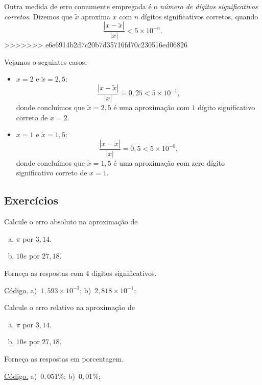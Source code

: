Outra medida de erro comumente empregada é o \emph{número de dígitos significativos corretos}. Dizemos que $\tilde{x}$ aproxima $x$ com $n$ dígitos significativos corretos, quando
\begin{equation}
  \frac{|x - \tilde{x}|}{|x|} < 5\times 10^{-n}.
\end{equation}
>>>>>>> e6e6914b2d7c20b7d35716fd70c230516ed06826

\begin{ex}\label{ex:numdigsigcorr}
  Vejamos o seguintes casos:
  \begin{itemize}
  \item $x=2$ e $\tilde{x} = 2,5$:
    \begin{equation}
      \frac{|x - \tilde{x}|}{|x|} = 0,25 < 5\times 10^{-1},
    \end{equation}
donde concluímos que $\tilde{x}=2,5$ é uma aproximação com $1$ dígito significativo correto de $x=2$.
  \item $x=1$ e $\tilde{x} = 1,5$:
    \begin{equation}
      \frac{|x - \tilde{x}|}{|x|} = 0,5 < 5\times 10^{-0},
    \end{equation}
donde concluímos que $\tilde{x}=1,5$ é uma aproximação com zero dígito significativo correto de $x=1$.
  \end{itemize}
\end{ex}

\subsection*{Exercícios}

\begin{exer}\label{exer:erro_abs}
  Calcule o erro absoluto na aproximação de
  \begin{enumerate}[a)]
  \item $\pi$ por $3,14$.
  \item $10e$ por $27,18$.
  \end{enumerate}
  Forneça as respostas com $4$ dígitos significativos.
\end{exer}
\begin{resp}
  \ifisoctave 
  \href{https://github.com/phkonzen/notas/blob/master/src/MatematicaNumerica/cap_aritm/dados/exer_erro_abs/exer_erro_abs.m}{Código.} 
  \fi
  a)~$1,593\times 10^{-3}$; b)~$2,818\times 10^{-1}$;
\end{resp}

\begin{exer}\label{exer:erro_rel}
  Calcule o erro relativo na aproximação de
  \begin{enumerate}[a)]
  \item $\pi$ por $3,14$.
  \item $10e$ por $27,18$.
  \end{enumerate}
  Forneça as respostas em porcentagem.
\end{exer}
\begin{resp}
  \ifisoctave 
  \href{https://github.com/phkonzen/notas/blob/master/src/MatematicaNumerica/cap_aritm/dados/exer_erro_rel/exer_erro_rel.m}{Código.} 
  \fi
  a)~$0,051\%$; b)~$0,01\%$;
\end{resp}

